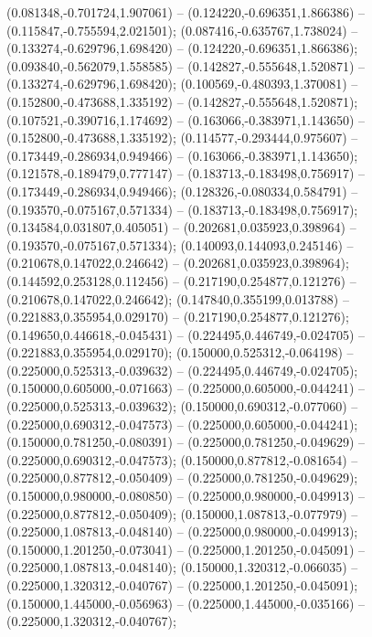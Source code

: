  (0.081348,-0.701724,1.907061) -- (0.124220,-0.696351,1.866386) -- (0.115847,-0.755594,2.021501);
 (0.087416,-0.635767,1.738024) -- (0.133274,-0.629796,1.698420) -- (0.124220,-0.696351,1.866386);
 (0.093840,-0.562079,1.558585) -- (0.142827,-0.555648,1.520871) -- (0.133274,-0.629796,1.698420);
 (0.100569,-0.480393,1.370081) -- (0.152800,-0.473688,1.335192) -- (0.142827,-0.555648,1.520871);
 (0.107521,-0.390716,1.174692) -- (0.163066,-0.383971,1.143650) -- (0.152800,-0.473688,1.335192);
 (0.114577,-0.293444,0.975607) -- (0.173449,-0.286934,0.949466) -- (0.163066,-0.383971,1.143650);
 (0.121578,-0.189479,0.777147) -- (0.183713,-0.183498,0.756917) -- (0.173449,-0.286934,0.949466);
 (0.128326,-0.080334,0.584791) -- (0.193570,-0.075167,0.571334) -- (0.183713,-0.183498,0.756917);
 (0.134584,0.031807,0.405051) -- (0.202681,0.035923,0.398964) -- (0.193570,-0.075167,0.571334);
 (0.140093,0.144093,0.245146) -- (0.210678,0.147022,0.246642) -- (0.202681,0.035923,0.398964);
 (0.144592,0.253128,0.112456) -- (0.217190,0.254877,0.121276) -- (0.210678,0.147022,0.246642);
 (0.147840,0.355199,0.013788) -- (0.221883,0.355954,0.029170) -- (0.217190,0.254877,0.121276);
 (0.149650,0.446618,-0.045431) -- (0.224495,0.446749,-0.024705) -- (0.221883,0.355954,0.029170);
 (0.150000,0.525312,-0.064198) -- (0.225000,0.525313,-0.039632) -- (0.224495,0.446749,-0.024705);
 (0.150000,0.605000,-0.071663) -- (0.225000,0.605000,-0.044241) -- (0.225000,0.525313,-0.039632);
 (0.150000,0.690312,-0.077060) -- (0.225000,0.690312,-0.047573) -- (0.225000,0.605000,-0.044241);
 (0.150000,0.781250,-0.080391) -- (0.225000,0.781250,-0.049629) -- (0.225000,0.690312,-0.047573);
 (0.150000,0.877812,-0.081654) -- (0.225000,0.877812,-0.050409) -- (0.225000,0.781250,-0.049629);
 (0.150000,0.980000,-0.080850) -- (0.225000,0.980000,-0.049913) -- (0.225000,0.877812,-0.050409);
 (0.150000,1.087813,-0.077979) -- (0.225000,1.087813,-0.048140) -- (0.225000,0.980000,-0.049913);
 (0.150000,1.201250,-0.073041) -- (0.225000,1.201250,-0.045091) -- (0.225000,1.087813,-0.048140);
 (0.150000,1.320312,-0.066035) -- (0.225000,1.320312,-0.040767) -- (0.225000,1.201250,-0.045091);
 (0.150000,1.445000,-0.056963) -- (0.225000,1.445000,-0.035166) -- (0.225000,1.320312,-0.040767);
